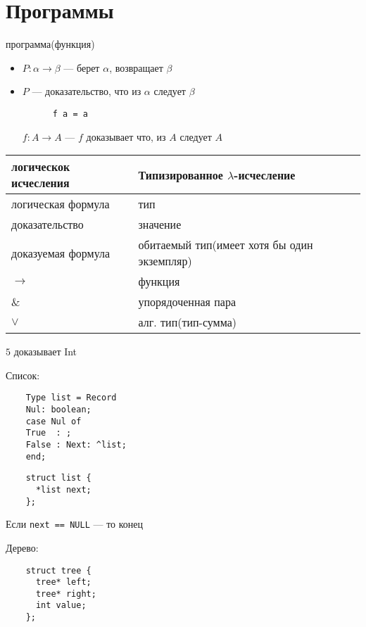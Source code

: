 \documentclass[oneside]{book}
\begin{document}
\section{Программы}
\label{sec:org9fb8a8c}
программа(функция)
\begin{itemize}
	\item \(P: \alpha \to \beta\) --- берет \(\alpha\), возвращает \(\beta\)
	\item \(P\) --- доказательство, что из \(\alpha\) следует \(\beta\)
	      \begin{examp}
		      \-
		      \begin{verbatim}
      f a = a
    \end{verbatim}
		      \(f: A \to A\) --- \(f\) доказывает что, из \(A\) следует \(A\)
	      \end{examp}
\end{itemize}

\begin{center}
	\begin{tabular}{ll}
		логическок исчесления & Типизированное \(\lambda\)-исчесление       \\
		\hline
		логическая формула    & тип                                         \\
		доказательство        & значение                                    \\
		доказуемая формула    & обитаемый тип(имеет хотя бы один экземпляр) \\
		\(\to\)               & функция                                     \\
		\&                    & упорядоченная пара                          \\
		\(\vee\)              & алг. тип(тип-сумма)                         \\
	\end{tabular}
\end{center}
\begin{examp}
	\(5\) доказывает Int
\end{examp}
\begin{examp}
	Список:
	\begin{verbatim}
    Type list = Record
    Nul: boolean;
    case Nul of
    True  : ;
    False : Next: ^list;
    end;
  \end{verbatim}
	\begin{verbatim}
    struct list {
      *list next;
    };
  \end{verbatim}
	Если \texttt{next == NULL} --- то конец
\end{examp}
\begin{examp}
	Дерево:
	\begin{verbatim}
    struct tree {
      tree* left;
      tree* right;
      int value;
    };
  \end{verbatim}
\end{examp}
\end{document}
